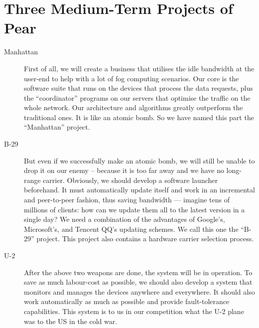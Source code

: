 \section{Three Medium-Term Projects of Pear}\label{sec-medium-term-projs}
\begin{description}
	\item[Manhattan] First of all, we will create a business that utilises the idle bandwidth at the user-end to help with a lot of fog computing scenarios. Our core is the software suite that runs on the devices that process the data requests, plus the ``coordinator'' programs on our servers that optimise the traffic on the whole network. Our architecture and algorithms greatly outperform the traditional ones. It is like an atomic bomb. So we have named this part the ``Manhattan'' project. 
	
	\item[B-29] But even if we successfully make an atomic bomb, we will still be unable to drop it on our enemy -- because it is too far away and we have no long-range carrier. Obviously, we should develop a software launcher beforehand. It must automatically update itself and work in an incremental and peer-to-peer fashion, thus saving bandwidth --- imagine tens of millions of clients: how can we update them all to the latest version in a single day? We need a combination of the advantages of Google's, Microsoft's, and Tencent QQ's updating schemes. We call this one the ``B-29'' project. This project also contains a hardware carrier selection process. 
	
	\item[U-2] After the above two weapons are done, the system will be in operation. To save as much labour-cost as possible, we should also develop a system that monitors and manages the devices anywhere and everywhere. It should also work automatically as much as possible and provide fault-tolerance capabilities. This system is to us in our competition what the U-2 plane was to the US in the cold war. 
	

\end{description}
